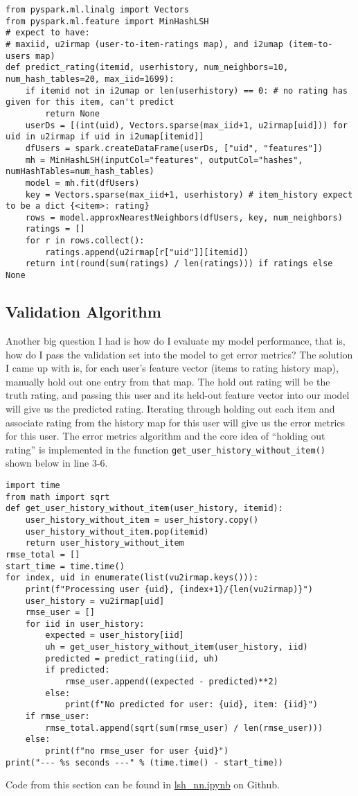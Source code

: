 \documentclass{scrartcl}
\begin{document}
\begin{lstlisting}
from pyspark.ml.linalg import Vectors
from pyspark.ml.feature import MinHashLSH
# expect to have:
# maxiid, u2irmap (user-to-item-ratings map), and i2umap (item-to-users map)
def predict_rating(itemid, userhistory, num_neighbors=10, num_hash_tables=20, max_iid=1699):
    if itemid not in i2umap or len(userhistory) == 0: # no rating has given for this item, can't predict
        return None
    userDs = [(int(uid), Vectors.sparse(max_iid+1, u2irmap[uid])) for uid in u2irmap if uid in i2umap[itemid]]
    dfUsers = spark.createDataFrame(userDs, ["uid", "features"])
    mh = MinHashLSH(inputCol="features", outputCol="hashes", numHashTables=num_hash_tables)
    model = mh.fit(dfUsers)
    key = Vectors.sparse(max_iid+1, userhistory) # item_history expect to be a dict {<item>: rating}
    rows = model.approxNearestNeighbors(dfUsers, key, num_neighbors)
    ratings = []
    for r in rows.collect():
        ratings.append(u2irmap[r["uid"]][itemid])
    return int(round(sum(ratings) / len(ratings))) if ratings else None
\end{lstlisting}
\subsection{Validation Algorithm}
\label{sec:va}
Another big question I had is how do I evaluate my model performance, that is, how do I pass the validation set into the model to get error metrics? The solution I came up with is, for each user's feature vector (items to rating history map), manually hold out one entry from that map. The hold out rating will be the truth rating, and passing this user and its held-out feature vector into our model will give us the predicted rating. Iterating through holding out each item and associate rating from the history map for this user will give us the error metrics for this user. The error metrics algorithm and the core idea of ``holding out rating'' is implemented in the function \texttt{get\_user\_history\_without\_item()} shown below in line 3-6.
\begin{lstlisting}
import time
from math import sqrt
def get_user_history_without_item(user_history, itemid):
    user_history_without_item = user_history.copy()
    user_history_without_item.pop(itemid)
    return user_history_without_item
rmse_total = []
start_time = time.time()
for index, uid in enumerate(list(vu2irmap.keys())):
    print(f"Processing user {uid}, {index+1}/{len(vu2irmap)}")
    user_history = vu2irmap[uid]
    rmse_user = []
    for iid in user_history:
        expected = user_history[iid]
        uh = get_user_history_without_item(user_history, iid)
        predicted = predict_rating(iid, uh)
        if predicted:
            rmse_user.append((expected - predicted)**2)
        else:
            print(f"No predicted for user: {uid}, item: {iid}")
    if rmse_user:
        rmse_total.append(sqrt(sum(rmse_user) / len(rmse_user)))
    else:
        print(f"no rmse_user for user {uid}")
print("--- %s seconds ---" % (time.time() - start_time))
\end{lstlisting}
Code from this section can be found in \href{https://github.com/ckwojai/cmpe297-final/blob/main/lsh\_nn.ipynb}{lsh\_nn.ipynb} on Github. \\
\end{document}
